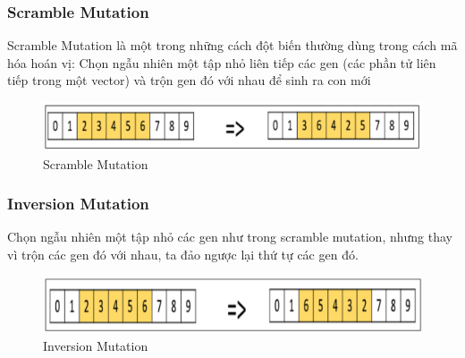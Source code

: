 \documentclass[a4paper,12pt]{report}
\begin{document}
\subsubsection{Scramble Mutation}
Scramble Mutation là một trong những cách đột biến thường dùng trong cách mã hóa hoán vị: Chọn ngẫu nhiên một tập nhỏ liên tiếp các gen (các phần tử liên tiếp trong một vector) và trộn gen đó với nhau để sinh ra con mới
\begin{figure}[H]
\centering 
\includegraphics[scale=0.4]{scramble_mutation.png}
\caption{Scramble Mutation}
\end{figure}

\subsubsection{Inversion Mutation}
Chọn ngẫu nhiên một tập nhỏ các gen như trong scramble mutation, nhưng thay vì trộn các gen đó với nhau, ta đảo ngược lại thứ tự các gen đó.
\begin{figure}[H]
\centering 
\includegraphics[scale=0.4]{inversion_mutation.png}
\caption{Inversion Mutation}
\end{figure}
\end{document}
